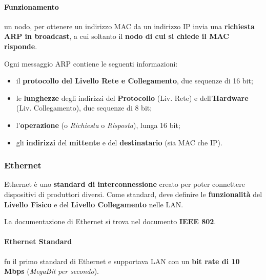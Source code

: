 \documentclass[a4paper]{article}
\begin{document}
				\paragraph{Funzionamento}
					un nodo, per ottenere un indirizzo MAC da un indirizzo IP invia una \textbf{richiesta ARP in broadcast}, a cui soltanto il \textbf{nodo di cui si chiede il MAC risponde}.
					
					Ogni messaggio ARP contiene le seguenti informazioni:
					\begin{itemize}
						\item il \textbf{protocollo del Livello Rete e Collegamento}, due sequenze di 16 bit;
						\item le \textbf{lunghezze} degli indirizzi del \textbf{Protocollo} (Liv. Rete) e dell'\textbf{Hardware} (Liv. Collegamento), due sequenze di 8 bit;
						\item l'\textbf{operazione} (o \emph{Richiesta} o \emph{Risposta}), lunga 16 bit;
						\item gli \textbf{indirizzi} del \textbf{mittente} e del \textbf{destinatario} (sia MAC che IP).
					\end{itemize}
			
				\newpage
				

			\subsubsection{Ethernet}
			
				Ethernet è uno \textbf{standard di interconnessione} creato per poter connettere dispositivi di produttori diversi. Come standard, deve definire le \textbf{funzionalità} del \textbf{Livello Fisico} e del \textbf{Livello Collegamento} nelle LAN.
				
				La documentazione di Ethernet si trova nel documento \textbf{IEEE 802}.
				
				\paragraph{Ethernet Standard}
					fu il primo standard di Ethernet e supportava LAN con un \textbf{bit rate di 10 Mbps} (\emph{MegaBit per secondo}).
					
\end{document}
